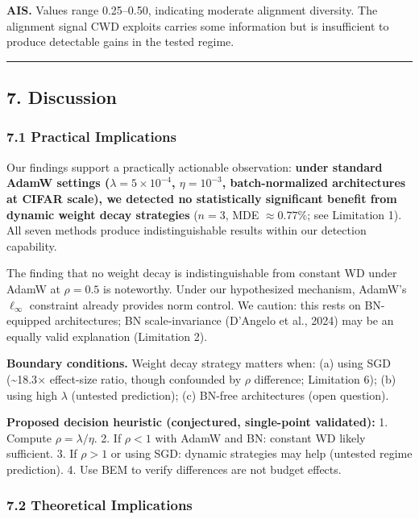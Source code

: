 \documentclass[
]{article}
\begin{document}
\textbf{AIS.} Values range 0.25--0.50, indicating moderate alignment
diversity. The alignment signal CWD exploits carries some information
but is insufficient to produce detectable gains in the tested regime.

\begin{center}\rule{0.5\linewidth}{0.5pt}\end{center}

\hypertarget{discussion}{%
\subsection{7. Discussion}\label{discussion}}

\hypertarget{practical-implications}{%
\subsubsection{7.1 Practical
Implications}\label{practical-implications}}

Our findings support a practically actionable observation: \textbf{under
standard AdamW settings (\(\lambda = 5 \times 10^{-4}\),
\(\eta = 10^{-3}\), batch-normalized architectures at CIFAR scale), we
detected no statistically significant benefit from dynamic weight decay
strategies} (\(n = 3\), MDE \(\approx 0.77\%\); see Limitation 1). All
seven methods produce indistinguishable results within our detection
capability.

The finding that no weight decay is indistinguishable from constant WD
under AdamW at \(\rho = 0.5\) is noteworthy. Under our hypothesized
mechanism, AdamW's \(\ell_\infty\) constraint already provides norm
control. We caution: this rests on BN-equipped architectures; BN
scale-invariance (D'Angelo et al., 2024) may be an equally valid
explanation (Limitation 2).

\textbf{Boundary conditions.} Weight decay strategy matters when: (a)
using SGD (\textasciitilde18.3\(\times\) effect-size ratio, though
confounded by \(\rho\) difference; Limitation 6); (b) using high
\(\lambda\) (untested prediction); (c) BN-free architectures (open
question).

\textbf{Proposed decision heuristic (conjectured, single-point
validated):} 1. Compute \(\rho = \lambda/\eta\). 2. If \(\rho < 1\) with
AdamW and BN: constant WD likely sufficient. 3. If \(\rho > 1\) or using
SGD: dynamic strategies may help (untested regime prediction). 4. Use
BEM to verify differences are not budget effects.

\hypertarget{theoretical-implications}{%
\subsubsection{7.2 Theoretical
Implications}\label{theoretical-implications}}
\end{document}
